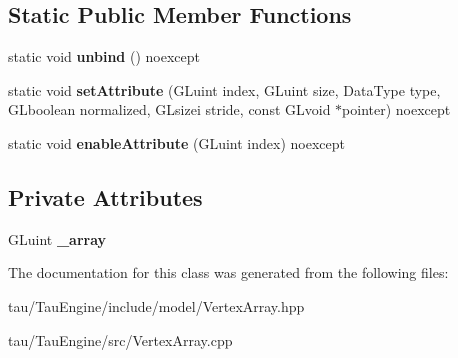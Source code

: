 \subsection*{Static Public Member Functions}
\begin{DoxyCompactItemize}
\item 
\mbox{\label{class_vertex_array_aa9ad2bd57ae62d96891cb714036d4776}} 
static void {\bfseries unbind} () noexcept
\item 
\mbox{\label{class_vertex_array_a9822f49e292e9bf53381a2933a4b5c33}} 
static void {\bfseries set\+Attribute} (G\+Luint index, G\+Luint size, Data\+Type type, G\+Lboolean normalized, G\+Lsizei stride, const G\+Lvoid $\ast$pointer) noexcept
\item 
\mbox{\label{class_vertex_array_a0b243bb18165883d319efeca5580d332}} 
static void {\bfseries enable\+Attribute} (G\+Luint index) noexcept
\end{DoxyCompactItemize}
\subsection*{Private Attributes}
\begin{DoxyCompactItemize}
\item 
\mbox{\label{class_vertex_array_a9618a9ae63cdfe4767cadf4423109a52}} 
G\+Luint {\bfseries \+\_\+array}
\end{DoxyCompactItemize}


The documentation for this class was generated from the following files\+:\begin{DoxyCompactItemize}
\item 
tau/\+Tau\+Engine/include/model/Vertex\+Array.\+hpp\item 
tau/\+Tau\+Engine/src/Vertex\+Array.\+cpp\end{DoxyCompactItemize}
